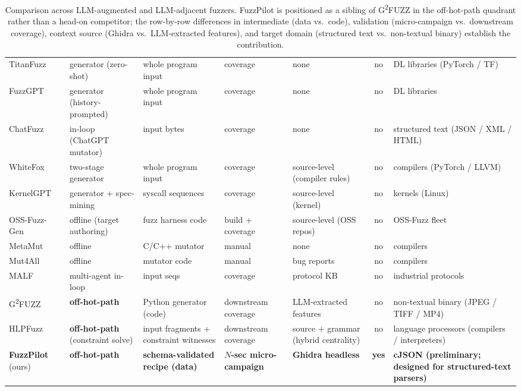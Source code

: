 \documentclass[11pt]{article}
\begin{document}
\begin{table}[H]
\begin{tabularx}{\textwidth}{@{}L Y{15mm} Y{22mm} Y{22mm} Y{22mm} c Y{30mm}@{}}
    TitanFuzz~\cite{deng2023titanfuzz} & generator (zero-shot) & whole program input & coverage & none & no & DL libraries (PyTorch / TF) \\
    FuzzGPT~\cite{deng2024fuzzgpt}     & generator (history-prompted) & whole program input & coverage & none & no & DL libraries \\
    ChatFuzz~\cite{hu2023chatfuzz}     & in-loop (ChatGPT mutator) & input bytes & coverage & none & no & structured text (JSON / XML / HTML) \\
    WhiteFox~\cite{yang2024whitefox}   & two-stage generator & whole program input & coverage & source-level (compiler rules) & no & compilers (PyTorch / LLVM) \\
    KernelGPT~\cite{yang2024kernelgpt} & generator + spec-mining & syscall sequences & coverage & source-level (kernel) & no & kernels (Linux) \\
    OSS-Fuzz-Gen~\cite{liu2024ossfuzzgen} & offline (target authoring) & fuzz harness code & build + coverage & source-level (OSS repos) & no & OSS-Fuzz fleet \\
    MetaMut~\cite{ou2024metamut}       & offline       & C/C++ mutator   & manual          & none           & no   & compilers               \\
    Mut4All~\cite{ye2025mut4all}       & offline       & mutator code    & manual          & bug reports    & no   & compilers               \\
    MALF~\cite{malf2025}               & multi-agent in-loop & input seqs & coverage       & protocol KB    & no   & industrial protocols    \\
    G\textsuperscript{2}FUZZ~\cite{liu2025g2fuzz} & \textbf{off-hot-path} & Python generator (code) & downstream coverage & LLM-extracted features & no & non-textual binary (JPEG / TIFF / MP4) \\
    HLPFuzz~\cite{yang2025hlpfuzz} & \textbf{off-hot-path} (constraint solve) & input fragments + constraint witnesses & downstream coverage & source + grammar (hybrid centrality) & no & language processors (compilers / interpreters) \\
    \midrule
    \textbf{FuzzPilot} (ours)          & \textbf{off-hot-path} & \textbf{schema-validated recipe (data)} & \textbf{$N$-sec micro-campaign} & \textbf{Ghidra headless} & \textbf{yes} & \textbf{cJSON (preliminary; designed for structured-text parsers)} \\
    \bottomrule
  \end{tabularx}
  \caption{Comparison across LLM-augmented and LLM-adjacent fuzzers.
  FuzzPilot is positioned as a sibling of G\textsuperscript{2}FUZZ
  in the off-hot-path quadrant rather than a head-on competitor; the
  row-by-row differences in intermediate (data vs.~code), validation
  (micro-campaign vs.~downstream coverage), context source (Ghidra
  vs.~LLM-extracted features), and target domain (structured text
  vs.~non-textual binary) establish the contribution.}
  \label{tab:related}
\end{table}
\end{document}
